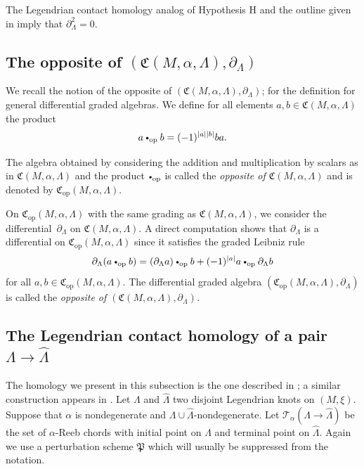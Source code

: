 \documentclass[JEP,XML,SOM,Unicode,NoFloatCountersInSection]{cedram}
\let\mathcal\mathscr
\let\ra\rightarrow
\newcommand{\opp}{\mathrm{op}}
\newcommand{\cbullet}{{\raisebox{1pt}{$\scriptscriptstyle\bullet$}}}
\newcommand*{\bigcdotop}{\mathbin{\cbullet_{\opp}}}
\theoremstyle{plain}
\theoremstyle{definition}
\numberwithin{equation}{subsection}
\begin{document}
The Legendrian contact homology analog of Hypothesis H and the outline given in \cite[\S 2.8]{SFT} imply that $\partial_{\Lambda}^2=0$.

\subsection{The opposite of $(\mathfrak{C}(M,\alpha,\Lambda),\partial_{\Lambda})$}

We recall the notion of the opposite of $(\mathfrak{C}(M,\alpha,\Lambda),\partial_{\Lambda})$; \cf \cite{Halp,St} for the definition for general differential graded algebras.
We define for all elements $a,b \in \mathfrak{C}(M,\alpha,\Lambda)$ the product
\begin{equation}
a \bigcdotop b = (-1)^{|a||b|}ba.
\end{equation}

The algebra obtained by considering the addition and multiplication by scalars as in $\mathfrak{C}(M,\alpha,\Lambda)$ and the product $\bigcdotop$ is called the {\em opposite of $\mathfrak{C}(M,\alpha,\Lambda)$} and is denoted by $\mathfrak{C}_{\opp}(M,\alpha,\Lambda)$.

On $\mathfrak{C}_{\opp}(M,\alpha,\Lambda)$ with the same grading as $\mathfrak{C}(M,\alpha,\Lambda)$, we consider the differential~$\partial_\Lambda$ on $\mathfrak{C}(M,\alpha,\Lambda)$. A direct computation shows that $\partial_\Lambda$ is a differential on $\mathfrak{C}_{\opp}(M,\alpha,\Lambda)$ since it satisfies the graded Leibniz rule
\begin{equation}
\partial_\Lambda(a \bigcdotop b)= (\partial_\Lambda a) \bigcdotop b + (-1)^{|a|}a \bigcdotop \partial_\Lambda b
\end{equation}
for all $a, b \in \mathfrak{C}_{\opp}(M,\alpha,\Lambda)$. The differential graded algebra $(\mathfrak{C}_{\opp}(M,\alpha,\Lambda),\partial_\Lambda)$ is called the {\em opposite of $(\mathfrak{C}(M,\alpha,\Lambda),\partial_{\Lambda})$.}

\subsection{The Legendrian contact homology of a pair $\Lambda\ra\widehat{\Lambda}$}

The homology we present in this subsection is the one described in \cite[Rem.\,7.4]{BEE}; a similar construction appears in \cite{Ek}.
Let $\Lambda$ and $\widehat{\Lambda}$ two disjoint Legendrian knots on $(M,\xi)$. Suppose that $\alpha$ is nondegenerate and $\Lambda\cup\widehat{\Lambda}$-nondegenerate. Let $\mathcal{T}_\alpha(\Lambda\ra\widehat{\Lambda})$ be the set of $\alpha$-Reeb chords with initial point on $\Lambda$ and terminal point on $\widehat{\Lambda}$. Again we use a perturbation scheme ${\mathfrak P}$ which will usually be suppressed from the notation.
\end{document}

